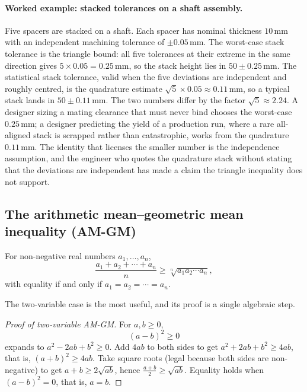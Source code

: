 \paragraph{Worked example: stacked tolerances on a shaft assembly.} Five
spacers are stacked on a shaft. Each spacer has nominal thickness
$10\,\si{\milli\meter}$ with an independent machining tolerance of $\pm
0.05\,\si{\milli\meter}$. The worst-case stack tolerance is the triangle
bound: all five tolerances at their extreme in the same direction gives
$5 \times 0.05 = 0.25\,\si{\milli\meter}$, so the stack height lies in
$50 \pm 0.25\,\si{\milli\meter}$. The statistical stack tolerance, valid
when the five deviations are independent and roughly centred, is the
quadrature estimate $\sqrt{5} \times 0.05 \approx
0.11\,\si{\milli\meter}$, so a typical stack lands in $50 \pm
0.11\,\si{\milli\meter}$. The two numbers differ by the factor
$\sqrt{5} \approx 2.24$. A designer sizing a mating clearance that must
never bind chooses the worst-case $0.25\,\si{\milli\meter}$; a designer
predicting the yield of a production run, where a rare all-aligned stack
is scrapped rather than catastrophic, works from the quadrature
$0.11\,\si{\milli\meter}$. The identity that licenses the smaller number
is the independence assumption, and the engineer who quotes the
quadrature stack without stating that the deviations are independent has
made a claim the triangle inequality does not support.

\subsection{The arithmetic mean--geometric mean inequality (AM-GM)}

For non-negative real numbers $a_{1}, \ldots, a_{n}$,
\[
\frac{a_{1} + a_{2} + \cdots + a_{n}}{n} \geq \sqrt[n]{a_{1} a_{2}
\cdots a_{n}},
\]
with equality if and only if $a_{1} = a_{2} = \cdots = a_{n}$.

The two-variable case is the most useful, and its proof is a single
algebraic step.

\begin{proof}[Proof of two-variable AM-GM]
For $a, b \geq 0$,
\[
(a - b)^{2} \geq 0
\]
expands to $a^{2} - 2ab + b^{2} \geq 0$. Add $4ab$ to both sides to
get $a^{2} + 2ab + b^{2} \geq 4ab$, that is, $(a+b)^{2} \geq 4ab$.
Take square roots (legal because both sides are non-negative) to
get $a + b \geq 2\sqrt{ab}$, hence $\frac{a+b}{2} \geq \sqrt{ab}$.
Equality holds when $(a-b)^{2} = 0$, that is, $a = b$.
\end{proof}

